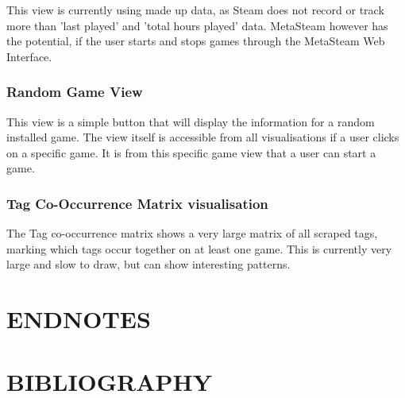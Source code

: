 \documentclass[11pt]{article}
\begin{document}
This view is currently using made up data, as Steam does not record or track more than 'last played' and 'total hours played' data. MetaSteam however has the potential, if the user starts and stops games through the MetaSteam Web Interface. 

\subsubsection*{Random Game View}
This view is a simple button that will display the information for a random installed game. The view itself is accessible from all visualisations if a user clicks on a specific game. It is from this specific game view that a user can start a game.

\subsubsection*{Tag Co-Occurrence Matrix visualisation}
The Tag co-occurrence matrix shows a very large matrix of all scraped tags, marking which tags occur together on at least one game. This is currently very large and slow to draw, but can show interesting patterns.


\section*{ENDNOTES}
\theendnotes

\section*{BIBLIOGRAPHY}
\printbibliography
\end{document}
